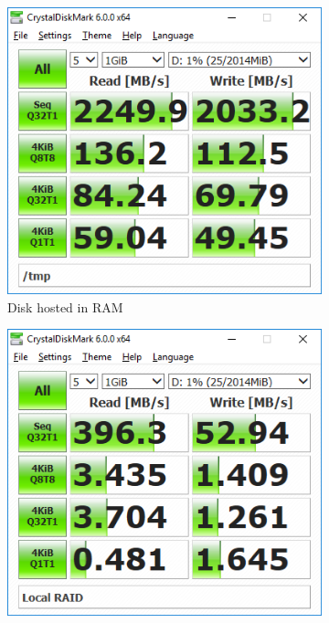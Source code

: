 \documentclass[12pt]{article}
\begin{document}
\begin{figure}[!ht]
	\centering
	\begin{subfigure}[t]{0.45\textwidth}
		\includegraphics[width=\textwidth]{ramdisk.png}
		\caption{Disk hosted in RAM}
	\end{subfigure}
	\begin{subfigure}[t]{0.45\textwidth}
		\includegraphics[width=\textwidth]{raid.png}

\end{subfigure}
\end{figure}
\end{document}
